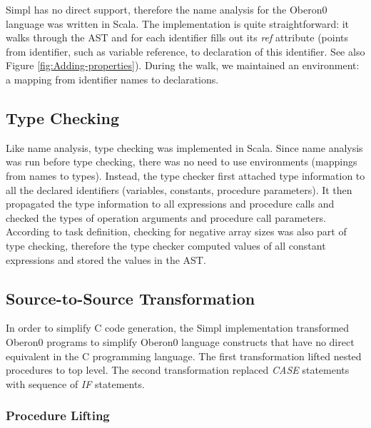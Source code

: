 Simpl has no direct support, therefore the name analysis for the Oberon0
language was written in Scala. The implementation is quite straightforward:
it walks through the AST and for each identifier fills out its \emph{ref}
attribute (points from identifier, such as variable reference, to
declaration of this identifier. See also Figure \ref{fig:Adding-properties}).
During the walk, we maintained an environment: a mapping from identifier
names to declarations.






\subsection{Type Checking}

Like name analysis, type checking was implemented in Scala. Since
name analysis was run before type checking, there was no need to use
environments (mappings from names to types). Instead, the type checker
first attached type information to all the declared identifiers (variables,
constants, procedure parameters). It then propagated the type information
to all expressions and procedure calls and checked the types of operation
arguments and procedure call parameters.  According to task definition,
checking for negative array sizes was also part of type checking,
therefore the type checker computed values of all constant expressions
and stored the values in the AST.




\subsection{Source-to-Source Transformation}

In order to simplify C code generation, the Simpl implementation transformed
Oberon0 programs to simplify Oberon0 language constructs that have
no direct equivalent in the C programming language. The first transformation
lifted nested procedures to top level. The second transformation replaced
\emph{CASE} statements with sequence of \emph{IF} statements.


\subsubsection{\label{sub:Procedure-Lifting}Procedure Lifting}

